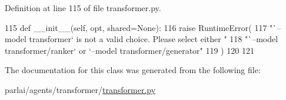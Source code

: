 Definition at line 115 of file transformer.\+py.


\begin{DoxyCode}
115     \textcolor{keyword}{def }\_\_init\_\_(self, opt, shared=None):
116         \textcolor{keywordflow}{raise} RuntimeError(
117             \textcolor{stringliteral}{"`--model transformer` is not a valid choice. Please select either "}
118             \textcolor{stringliteral}{"`--model transformer/ranker` or `--model transformer/generator"}
119         )
120 
121 
\end{DoxyCode}


The documentation for this class was generated from the following file\+:\begin{DoxyCompactItemize}
\item 
parlai/agents/transformer/\hyperlink{transformer_8py}{transformer.\+py}\end{DoxyCompactItemize}
